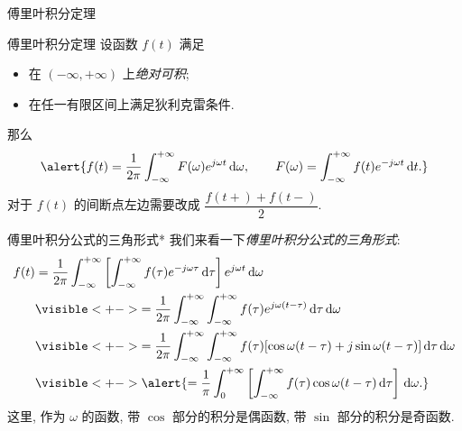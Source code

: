 \begin{frame}{傅里叶积分定理}
\beqskip{9pt}
\begin{block}{傅里叶积分定理}
设函数 $f(t)$ 满足
\begin{itemize}
\item 在 $(-\infty,+\infty)$ 上\emph{绝对可积};
\item 在任一有限区间上满足狄利克雷条件.
\end{itemize}
\onslide<+->
那么
\[\alert{f(t)=\frac1{2\pi} \int_{-\infty}^{+\infty}F(\omega) e^{j\omega t} \diff\omega,\qquad  F(\omega)=\int_{-\infty}^{+\infty}f(t) e^{-j\omega t} \diff t.}\]
\onslide<+->
对于 $f(t)$ 的间断点左边需要改成 $\dfrac{f(t+)+f(t-)}2$.
\end{block}
\onslide<+->
\begin{center}
\end{center}
\endgroup
\end{frame}


\begin{frame}{傅里叶积分公式的三角形式*}
\onslide<+->
我们来看一下\emph{傅里叶积分公式的三角形式}:
\onslide<+->
\begin{align*}
f(t)&=\frac1{2\pi} \int_{-\infty}^{+\infty}\left[\int_{-\infty}^{+\infty}f(\tau) e^{-j\omega\tau} \diff\tau\right] e^{j\omega t} \diff\omega\\
&\visible<+->{=\frac1{2\pi} \int_{-\infty}^{+\infty}\int_{-\infty}^{+\infty}f(\tau) e^{j\omega(t-\tau)}\diff\tau \diff\omega}\\
&\visible<+->{=\frac1{2\pi} \int_{-\infty}^{+\infty}\int_{-\infty}^{+\infty}f(\tau)[\cos{\omega(t-\tau)}+j\sin{\omega(t-\tau)}]\diff\tau \diff\omega}\\
&\visible<+->{\alert{=\frac1\pi\int_0^{+\infty}\left[\int_{-\infty}^{+\infty}f(\tau)\cos{\omega(t-\tau)}\diff\tau\right]\diff\omega.}}
\end{align*}
\onslide<+->
这里, 作为 $\omega$ 的函数, 带 $\cos$ 部分的积分是偶函数, 带 $\sin$ 部分的积分是奇函数.
\end{frame}


